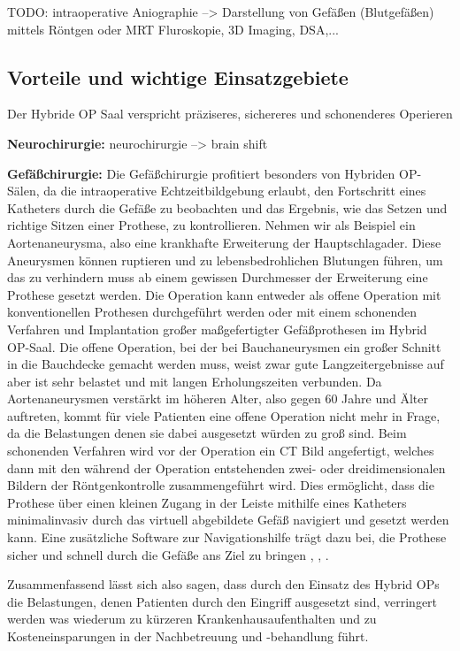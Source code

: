 TODO:
intraoperative Aniographie --> Darstellung von Gefäßen (Blutgefäßen) mittels Röntgen oder MRT
Fluroskopie, 3D Imaging, DSA,...

\subsection{Vorteile und wichtige Einsatzgebiete}

Der Hybride OP Saal verspricht präziseres, sichereres und schonenderes Operieren \cite{DresdnerUniklinikum}


\textbf{Neurochirurgie:}
neurochirurgie --> brain shift

\textbf{Gefäßchirurgie:}
Die Gefäßchirurgie profitiert besonders von Hybriden OP-Sälen, da die intraoperative Echtzeitbildgebung erlaubt, den Fortschritt eines Katheters durch die Gefäße zu beobachten und das Ergebnis, wie das Setzen und richtige Sitzen einer Prothese, zu kontrollieren.
Nehmen wir als Beispiel ein Aortenaneurysma, also eine krankhafte Erweiterung der Hauptschlagader. Diese Aneurysmen können ruptieren und zu lebensbedrohlichen Blutungen führen, um das zu verhindern muss ab einem gewissen Durchmesser der Erweiterung eine Prothese gesetzt werden. Die Operation kann entweder als offene Operation mit konventionellen Prothesen durchgeführt werden oder mit einem schonenden Verfahren und Implantation großer maßgefertigter Gefäßprothesen im Hybrid OP-Saal. Die offene Operation, bei der bei Bauchaneurysmen ein großer Schnitt in die Bauchdecke gemacht werden muss, weist zwar gute Langzeitergebnisse auf aber ist sehr belastet und mit langen Erholungszeiten verbunden. Da Aortenaneurysmen verstärkt im höheren Alter, also gegen 60 Jahre und Älter auftreten, kommt für viele Patienten eine offene Operation nicht mehr in Frage, da die Belastungen denen sie dabei ausgesetzt würden zu groß sind. 
Beim schonenden Verfahren wird vor der Operation ein CT Bild angefertigt, welches dann mit den während der Operation entstehenden zwei- oder dreidimensionalen Bildern der Röntgenkontrolle zusammengeführt wird. Dies ermöglicht, dass die Prothese über einen kleinen Zugang in der Leiste mithilfe eines Katheters minimalinvasiv durch das virtuell abgebildete Gefäß navigiert und gesetzt werden kann. Eine zusätzliche Software zur Navigationshilfe trägt dazu bei, die Prothese sicher und schnell durch die Gefäße ans Ziel zu bringen \cite{Aortenaneurysma}, \cite{DresdnerUniklinikum}, \cite{TickendeBombeImBauch}.

Zusammenfassend lässt sich also sagen, dass durch den Einsatz des Hybrid OPs die Belastungen, denen Patienten durch den Eingriff ausgesetzt sind, verringert werden was wiederum zu kürzeren Krankenhausaufenthalten und zu Kosteneinsparungen in der Nachbetreuung und -behandlung führt. 


